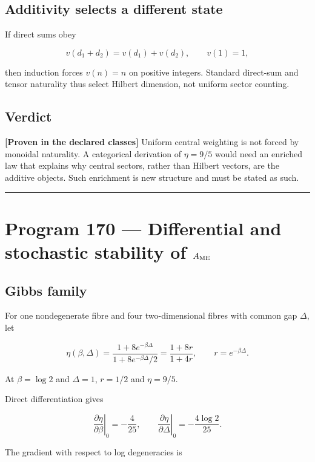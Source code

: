\documentclass[11pt,a4paper,openany]{report}
\begin{document}
\section{Additivity selects a different state}

If direct sums obey

\[
v(d_1+d_2)=v(d_1)+v(d_2),\qquad v(1)=1,
\]

then induction forces \(v(n)=n\) on positive integers. Standard direct-sum and tensor naturality thus select Hilbert dimension, not uniform sector counting.

\section{Verdict}

\textbf{[Proven in the declared classes]} Uniform central weighting is not forced by monoidal naturality. A categorical derivation of \(\eta=9/5\) would need an enriched law that explains why central sectors, rather than Hilbert vectors, are the additive objects. Such enrichment is new structure and must be stated as such.

\par\medskip\hrule\medskip

\chapter{\texorpdfstring{Program 170 --- Differential and stochastic stability of \(A_{\rm ME}\)}{Program 170 --- Differential and stochastic stability of A\_ ME}}

\section{Gibbs family}

For one nondegenerate fibre and four two-dimensional fibres with common gap \(\Delta\), let

\[
\eta(\beta,\Delta)
=
\frac{1+8e^{-\beta\Delta}}
{1+8e^{-\beta\Delta}/2}
=
\frac{1+8r}{1+4r},
\qquad r=e^{-\beta\Delta}.
\]

At \(\beta=\log2\) and \(\Delta=1\), \(r=1/2\) and \(\eta=9/5\).

Direct differentiation gives

\[
\left.\frac{\partial\eta}{\partial\beta}\right|_0
=-\frac4{25},
\qquad
\left.\frac{\partial\eta}{\partial\Delta}\right|_0
=-\frac{4\log2}{25}.
\]

The gradient with respect to log degeneracies is
\end{document}
